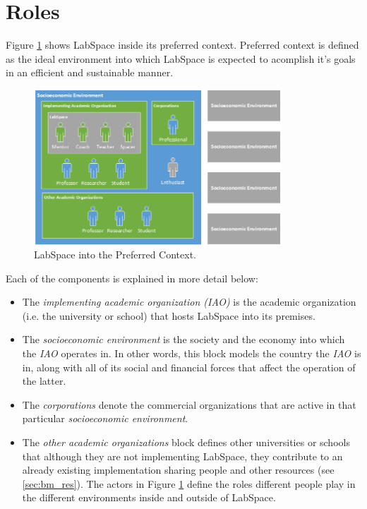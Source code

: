\documentclass[a4paper, 11pt]{article}
\begin{document}
\section{Roles} \label{sec:roles}
Figure \ref{fig:ls_env} shows LabSpace inside its preferred context. Preferred context is defined as the ideal environment into which LabSpace is expected to acomplish it's goals in an efficient and sustainable manner.

\begin{figure}[h!]
  \begin{center}
    \includegraphics[width=350px,height=\textheight,keepaspectratio]{imagery/ls_context.png}
    \caption{LabSpace into the Preferred Context.}
    \label{fig:ls_env}
  \end{center}
\end{figure}

Each of the components is explained in more detail below:

\begin{itemize}[noitemsep]
    \item The \textit{implementing academic organization (IAO)} is the academic organization (i.e. the university or school) that hosts LabSpace into its premises.
    \item The \textit{socioeconomic environment} is the society and the economy into which the \textit{IAO} operates in. In other words, this block models the country the \textit{IAO} is in, along with all of its social and financial forces that affect the operation of the latter.
    \item The \textit{corporations} denote the commercial organizations that are active in that particular \textit{socioeconomic environment}.
    \item The \textit{other academic organizations} block defines other universities or schools that although they are not implementing LabSpace, they contribute to an already existing implementation sharing people and other resources (see \ref{sec:bm_res}). The actors in Figure \ref{fig:ls_env} define the roles different people play in the different environments inside and outside of LabSpace. 
\end{itemize}
\end{document}
